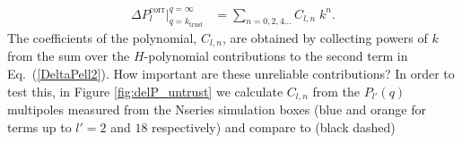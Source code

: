                                                                                                                                                                                                                                                                             \begin{align} \label{eq:delp_poly}
                                                                                                                                                                                                                                                                            \Delta P^\mathrm{corr}_l \bigg|_{q=k_\mathrm{trust}}^{q=\infty} &= 
                                                                                                                                                                                                                                                                            \sum\limits_{n= 0, 2, 4 ... } C_{l,n}\;k^{n}. 
                                                                                                                                                                                                                                                                            \end{align}
                                                                                                                                                                                                                                                                            The coefficients of the polynomial, $C_{l, n}$, are obtained by collecting powers of $k$ from the sum over the $H$-polynomial contributions to the second term in Eq.~(\ref{DeltaPell2}). How important are these unreliable contributions? In order to test this, in Figure \ref{fig:delP_untrust} 
                                                                                                                                                                                                                                                                            we calculate $C_{l, n}$ from the $P_{l'}(q)$ multipoles measured 
                                                                                                                                                                                                                                                                            from the Nseries simulation boxes (blue and orange for terms up 
                                                                                                                                                                                                                                                                            to $l'=2$ and $18$ respectively) and compare to (black dashed)
